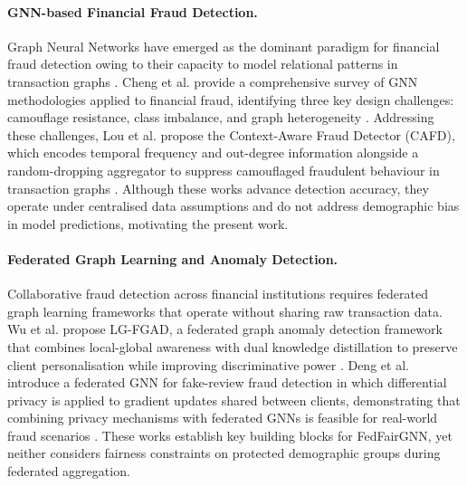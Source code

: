 \documentclass[pmlr]{jmlr}%
\begin{document}
\paragraph{GNN-based Financial Fraud Detection.} Graph Neural Networks have emerged as the dominant paradigm for financial fraud detection owing to their capacity to model relational patterns in transaction graphs \citep{cheng2025gnnfrauds}. Cheng et al. provide a comprehensive survey of GNN methodologies applied to financial fraud, identifying three key design challenges: camouflage resistance, class imbalance, and graph heterogeneity \citep{cheng2025gnnfrauds}. Addressing these challenges, Lou et al. propose the Context-Aware Fraud Detector (CAFD), which encodes temporal frequency and out-degree information alongside a random-dropping aggregator to suppress camouflaged fraudulent behaviour in transaction graphs \citep{lou2025cafd}. Although these works advance detection accuracy, they operate under centralised data assumptions and do not address demographic bias in model predictions, motivating the present work.

\paragraph{Federated Graph Learning and Anomaly Detection.} Collaborative fraud detection across financial institutions requires federated graph learning frameworks that operate without sharing raw transaction data. Wu et al. propose LG-FGAD, a federated graph anomaly detection framework that combines local-global awareness with dual knowledge distillation to preserve client personalisation while improving discriminative power \citep{wu2024lgfgad}. Deng et al. introduce a federated GNN for fake-review fraud detection in which differential privacy is applied to gradient updates shared between clients, demonstrating that combining privacy mechanisms with federated GNNs is feasible for real-world fraud scenarios \citep{deng2025dpfedgraph}. These works establish key building blocks for FedFairGNN, yet neither considers fairness constraints on protected demographic groups during federated aggregation.
\end{document}
